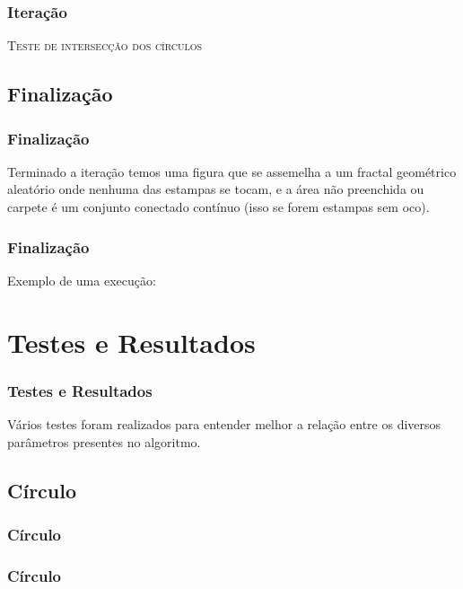 \documentclass[aspectratio=169]{beamer}
\begin{document}
\begin{frame}
\frametitle{Iteração}

\begin{algorithm}[H]
   \SetAlgoLined
   \label{alg1}
   \caption{\textsc{Teste de intersecção dos círculos}}
 \end{algorithm}
 
\end{frame}

\subsection{Finalização}
\begin{frame}
\frametitle{Finalização}
Terminado a iteração temos uma figura que se assemelha a um fractal geométrico aleatório onde nenhuma das estampas se tocam, e a área não preenchida ou carpete é um conjunto conectado contínuo (isso se forem estampas sem oco).

\end{frame}

\begin{frame}
\frametitle{Finalização}

Exemplo de uma execução:

\end{frame}

\section{Testes e Resultados}
\begin{frame}
\frametitle{Testes e Resultados}
Vários testes foram realizados para entender melhor a relação entre os diversos parâmetros presentes no algoritmo.
\end{frame}

\subsection{Círculo}
\begin{frame}
\frametitle{Círculo}
\end{frame}

\begin{frame}
\frametitle{Círculo}
\end{frame}
\end{document}
